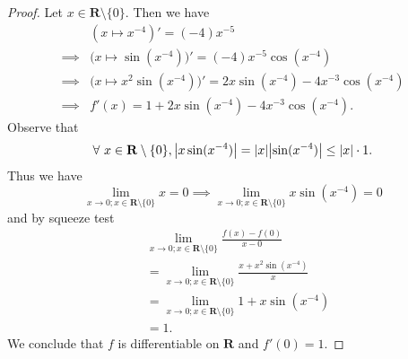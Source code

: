\begin{proof}
    Let \(x \in \mathbf{R} \setminus \{0\}\).
    Then we have
    \begin{align*}
                 & (x \mapsto x^{-4})' = (-4) x^{-5}                                               \\
        \implies & \big(x \mapsto \sin(x^{-4})\big)' = (-4) x^{-5} \cos(x^{-4})                    \\
        \implies & \big(x \mapsto x^2 \sin(x^{-4})\big)' = 2x \sin(x^{-4}) - 4 x^{-3} \cos(x^{-4}) \\
        \implies & f'(x) = 1 + 2 x \sin(x^{-4}) - 4 x^{-3} \cos(x^{-4}).
    \end{align*}
    Observe that
    \[
        \forall\ x \in \mathbf{R} \setminus \{0\}, \abs*{x \sin(x^{-4})} = \abs*{x} \abs*{\sin(x^{-4})} \leq \abs*{x} \cdot 1.
    \]
    Thus we have
    \[
        \lim_{x \to 0 ; x \in \mathbf{R} \setminus \{0\}} x = 0 \implies \lim_{x \to 0 ; x \in \mathbf{R} \setminus \{0\}} x \sin(x^{-4}) = 0
    \]
    and by squeeze test
    \begin{align*}
         & \lim_{x \to 0 ; x \in \mathbf{R} \setminus \{0\}} \frac{f(x) - f(0)}{x - 0}        \\
         & = \lim_{x \to 0 ; x \in \mathbf{R} \setminus \{0\}} \frac{x + x^2 \sin(x^{-4})}{x} \\
         & = \lim_{x \to 0 ; x \in \mathbf{R} \setminus \{0\}} 1 + x \sin(x^{-4})             \\
         & = 1.
    \end{align*}
    We conclude that \(f\) is differentiable on \(\mathbf{R}\) and \(f'(0) = 1\).


\end{proof}
